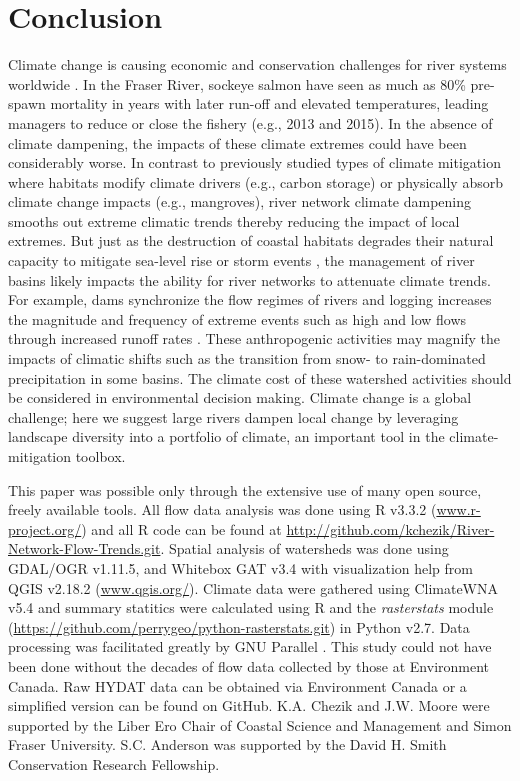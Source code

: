 \documentclass[draft,linenumbers]{AGUJournal}
\begin{document}
\section{Conclusion}

Climate change is causing economic and conservation challenges for river systems worldwide \citep{Palmer:2009,Pecl:2017}. In the Fraser River, sockeye salmon have seen as much as 80\% pre-spawn mortality in years with later run-off and elevated temperatures, leading managers to reduce or close the fishery (e.g., 2013 and 2015). In the absence of climate dampening, the impacts of these climate extremes could have been considerably worse. In contrast to previously studied types of climate mitigation where habitats modify climate drivers (e.g., carbon storage) or physically absorb climate change impacts (e.g., mangroves), river network climate dampening smooths out extreme climatic trends thereby reducing the impact of local extremes. But just as the destruction of coastal habitats degrades their natural capacity to mitigate sea-level rise or storm events \citep{Arkema:2013}, the management of river basins likely impacts the ability for river networks to attenuate climate trends. For example, dams synchronize the flow regimes of rivers \citep{Poff:2007} and logging increases the magnitude and frequency of extreme events such as high and low flows through increased runoff rates \citep{Zhang:2014}. These anthropogenic activities may magnify the impacts of climatic shifts such as the transition from snow- to rain-dominated precipitation in some basins. The climate cost of these watershed activities should be considered in environmental decision making. Climate change is a global challenge; here we suggest large rivers dampen local change by leveraging landscape diversity into a portfolio of climate, an important tool in the climate-mitigation toolbox.


\acknowledgments
This paper was possible only through the extensive use of many open source, freely available tools. All flow data analysis was done using R v3.3.2 (\url{www.r-project.org/}) and all R code can be found at \url{http://github.com/kchezik/River-Network-Flow-Trends.git}. Spatial analysis of watersheds was done using GDAL/OGR v1.11.5, and Whitebox GAT v3.4 \citep{Lindsay:2016} with visualization help from QGIS v2.18.2 (\url{www.qgis.org/}). Climate data were gathered using ClimateWNA v5.4 \citep{Wang:2016} and summary statitics were calculated using R and the \textit{rasterstats} module (\url{https://github.com/perrygeo/python-rasterstats.git}) in Python v2.7. Data processing was facilitated greatly by GNU Parallel \citep{Tange2011a}. This study could not have been done without the decades of flow data collected by those at Environment Canada. Raw HYDAT data can be obtained via Environment Canada or a simplified version can be found on GitHub. K.A. Chezik and J.W. Moore were supported by the Liber Ero Chair of Coastal Science and Management and Simon Fraser University. S.C. Anderson was supported by the David H. Smith Conservation Research Fellowship.
\end{document}
